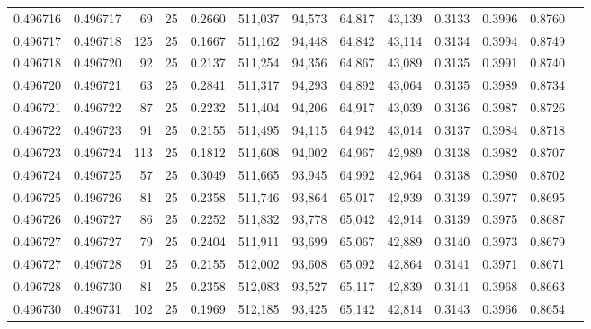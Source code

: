 \begin{tabular}{rrrrrrrrrrrrr}
0.496716 & 0.496717 &    69 &  25 &                                     0.2660 & 511,037 &  94,573 &  64,817 &  43,139 & 0.3133 & 0.3996 & 0.8760 \\
0.496717 & 0.496718 &   125 &  25 &                                     0.1667 & 511,162 &  94,448 &  64,842 &  43,114 & 0.3134 & 0.3994 & 0.8749 \\
0.496718 & 0.496720 &    92 &  25 &                                     0.2137 & 511,254 &  94,356 &  64,867 &  43,089 & 0.3135 & 0.3991 & 0.8740 \\
0.496720 & 0.496721 &    63 &  25 &                                     0.2841 & 511,317 &  94,293 &  64,892 &  43,064 & 0.3135 & 0.3989 & 0.8734 \\
0.496721 & 0.496722 &    87 &  25 &                                     0.2232 & 511,404 &  94,206 &  64,917 &  43,039 & 0.3136 & 0.3987 & 0.8726 \\
0.496722 & 0.496723 &    91 &  25 &                                     0.2155 & 511,495 &  94,115 &  64,942 &  43,014 & 0.3137 & 0.3984 & 0.8718 \\
0.496723 & 0.496724 &   113 &  25 &                                     0.1812 & 511,608 &  94,002 &  64,967 &  42,989 & 0.3138 & 0.3982 & 0.8707 \\
0.496724 & 0.496725 &    57 &  25 &                                     0.3049 & 511,665 &  93,945 &  64,992 &  42,964 & 0.3138 & 0.3980 & 0.8702 \\
0.496725 & 0.496726 &    81 &  25 &                                     0.2358 & 511,746 &  93,864 &  65,017 &  42,939 & 0.3139 & 0.3977 & 0.8695 \\
0.496726 & 0.496727 &    86 &  25 &                                     0.2252 & 511,832 &  93,778 &  65,042 &  42,914 & 0.3139 & 0.3975 & 0.8687 \\
0.496727 & 0.496727 &    79 &  25 &                                     0.2404 & 511,911 &  93,699 &  65,067 &  42,889 & 0.3140 & 0.3973 & 0.8679 \\
0.496727 & 0.496728 &    91 &  25 &                                     0.2155 & 512,002 &  93,608 &  65,092 &  42,864 & 0.3141 & 0.3971 & 0.8671 \\
0.496728 & 0.496730 &    81 &  25 &                                     0.2358 & 512,083 &  93,527 &  65,117 &  42,839 & 0.3141 & 0.3968 & 0.8663 \\
0.496730 & 0.496731 &   102 &  25 &                                     0.1969 & 512,185 &  93,425 &  65,142 &  42,814 & 0.3143 & 0.3966 & 0.8654 \\

\end{tabular}
